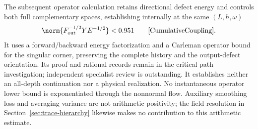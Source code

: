 The subsequent operator calculation retains directional defect
energy and controls both full complementary spaces, establishing
internally at the same $(L,h,\omega)$
\[
 \norm{F_{\mathrm{out}}^{-1/2}YE^{-1/2}}<0.951
 \qquad\cite{CumulativeCoupling}.
\]
It uses a forward/backward energy factorization and a Carleman
operator bound for the singular corner, preserving the complete
history and the output-defect orientation. Its proof and rational
records remain in the critical-path investigation; independent
specialist review is outstanding. It establishes neither an
all-depth continuation nor a physical realization. No instantaneous
operator lower bound is exponentiated through the nonnormal flow.
Auxiliary smoothing loss and averaging variance are not arithmetic
positivity; the field resolution in Section~\ref{sec:trace-hierarchy}
likewise makes no contribution to this arithmetic estimate.
